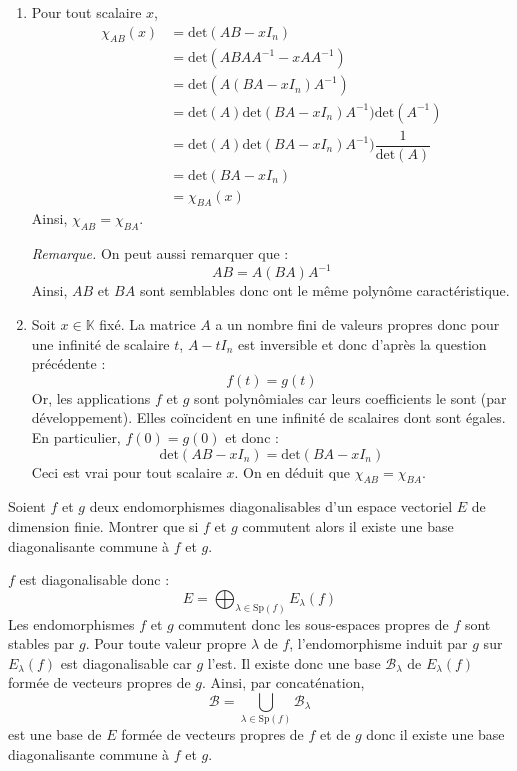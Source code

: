 \documentclass[a4paper,10pt]{report}
\begin{document}
\begin{enumerate}
\item Pour tout scalaire $x$,
\begin{align*}
\chi_{AB}(x) & = \textrm{det}(AB-xI_n) \\
& = \textrm{det}(ABAA^{-1}-xA A^{-1}) \\
& = \textrm{det}(A(BA-xI_n) A^{-1}) \\
& = \textrm{det}(A)\textrm{det}(BA-xI_n) A^{-1})\textrm{det}(A^{-1}) \\
& = \textrm{det}(A)\textrm{det}(BA-xI_n) A^{-1}) \dfrac{1}{\textrm{det}(A)} \\
& = \textrm{det}(BA-xI_n) \\
& = \chi_{BA}(x)
\end{align*}
Ainsi, $\chi_{AB}= \chi_{BA}$.

\medskip

\noindent \textit{Remarque.} On peut aussi remarquer que :
$$ AB=  A(BA)A^{-1}$$
Ainsi, $AB$ et $BA$ sont semblables donc ont le même polynôme caractéristique.
\item Soit $x \in \mathbb{K}$ fixé. La matrice $A$ a un nombre fini de valeurs propres donc pour une infinité de scalaire $t$, $A-t I_n$ est inversible et donc d'après la question précédente :
$$ f(t)=g(t)$$
Or, les applications $f$ et $g$ sont polynômiales car leurs coefficients le sont (par développement). Elles coïncident en une infinité de scalaires dont sont égales. En particulier, $f(0)=g(0)$ et donc :
$$ \textrm{det}(AB-xI_n)= \textrm{det}(BA-xI_n)$$
Ceci est vrai pour tout scalaire $x$. On en déduit que $\chi_{AB}= \chi_{BA}$.
\end{enumerate}

\begin{Exa}  Soient $f$ et $g$ deux endomorphismes diagonalisables d'un espace vectoriel $E$ de dimension finie. Montrer que si $f$ et $g$ commutent alors il existe une base diagonalisante commune à $f$ et $g$.
\end{Exa}

\corr $f$ est diagonalisable donc :
$$ E = \bigoplus_{\lambda \in \textrm{Sp}(f)} E_{\lambda}(f)$$
Les endomorphismes $f$ et $g$ commutent donc les sous-espaces propres de $f$ sont stables par $g$. Pour toute valeur propre $\lambda$ de $f$, l'endomorphisme induit par $g$ sur $E_{\lambda}(f)$ est diagonalisable car $g$ l'est. Il existe donc une base $\mathcal{B}_{\lambda}$ de $E_{\lambda}(f)$ formée de vecteurs propres de $g$. Ainsi, par concaténation,
$$ \mathcal{B} = \bigcup_{\lambda  \in \textrm{Sp}(f)} \mathcal{B}_{\lambda}$$
est une base de $E$ formée de vecteurs propres de $f$ et de $g$ donc il existe une base diagonalisante commune à $f$ et $g$.
\end{document}
